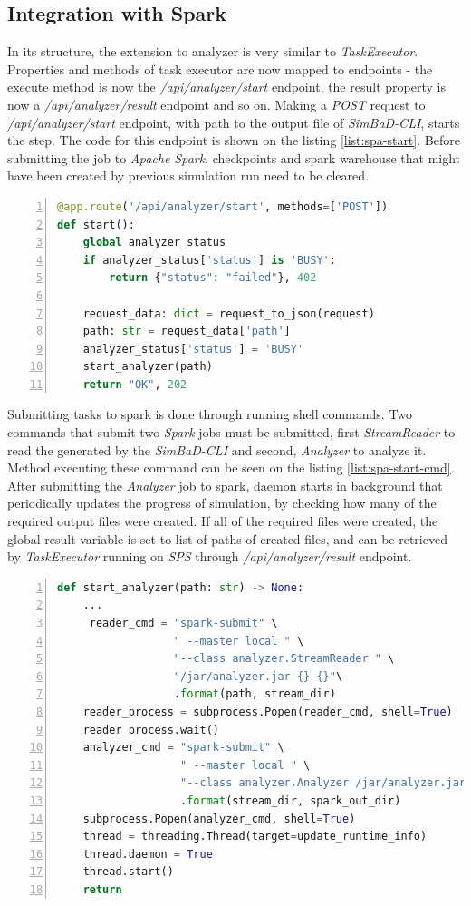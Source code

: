 \subsection{Integration with Spark}
In its structure, the extension to analyzer is very similar to \textit{TaskExecutor}. Properties and methods of task executor are now mapped to endpoints - the execute method is now the \textit{/api/analyzer/start} endpoint, the result property is now a \textit{/api/analyzer/result} endpoint and so on. Making a \textit{POST} request to \textit{/api/analyzer/start} endpoint, with path to the output file of \textit{SimBaD-CLI}, starts the step. The code for this endpoint is shown on the listing \ref{list:spa-start}. Before submitting the job to \textit{Apache Spark}, checkpoints and spark warehouse that might have been created by previous simulation run need to be cleared.
\begin{lstlisting}[label=list:spa-start,caption=Endpoint starting \textit{SimBaD-Analyzer} step, basicstyle=\footnotesize\ttfamily, language=python, numbers=left]
@app.route('/api/analyzer/start', methods=['POST'])
def start():
    global analyzer_status
    if analyzer_status['status'] is 'BUSY':
        return {"status": "failed"}, 402
        
    request_data: dict = request_to_json(request)
    path: str = request_data['path']
    analyzer_status['status'] = 'BUSY'
    start_analyzer(path)
    return "OK", 202
\end{lstlisting}
Submitting tasks to spark is done through running shell commands. Two commands that submit two \textit{Spark} jobs must be submitted, first \textit{StreamReader} to read the generated by the \textit{SimBaD-CLI} and second, \textit{Analyzer} to analyze it. Method executing these command can be seen on the listing \ref{list:spa-start-cmd}. After submitting the \textit{Analyzer} job to spark, daemon starts in background that periodically updates the progress of simulation, by checking how many of the required output files were created. If all of the required files were created, the global result variable is set to list of paths of created files, and can be retrieved by \textit{TaskExecutor} running on \textit{SPS} through \textit{/api/analyzer/result} endpoint.
\begin{lstlisting}[label=list:spa-start-cmd,caption=Method submitting the \textit{StreamReader} and \textit{Analyzer} jobs, basicstyle=\footnotesize\ttfamily, language=python, numbers=left]
def start_analyzer(path: str) -> None:
    ...
     reader_cmd = "spark-submit" \
                  " --master local " \
                  "--class analyzer.StreamReader " \
                  "/jar/analyzer.jar {} {}"\
                  .format(path, stream_dir)
    reader_process = subprocess.Popen(reader_cmd, shell=True)
    reader_process.wait()
    analyzer_cmd = "spark-submit" \
                   " --master local " \
                   "--class analyzer.Analyzer /jar/analyzer.jar {} {}"\
                   .format(stream_dir, spark_out_dir)
    subprocess.Popen(analyzer_cmd, shell=True)
    thread = threading.Thread(target=update_runtime_info)
    thread.daemon = True
    thread.start()
    return
\end{lstlisting}
